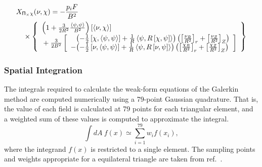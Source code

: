 \begin{eqnarray*}
  & \lefteqn{X_{\P_\times \chi}(\nu, \chi) = -\frac{p_i F}{B^2}} &
  \\ && \mbox{} \times 
  \left\{ \begin{array}{l}
    \left(1 + \frac{3}{2 R^2} \frac{\ip{\psi}{\psi}}{B^2} \right)
    \funcsa{\nu}{\chi}
    \\ \mbox{} + \frac{3}{2 B^2} \left[ \begin{array}{r@{}l}
      & \left(- \frac{1}{2} \pb{\chi}{\ip{\psi}{\psi}}
	      + \frac{1}{R} \ip{\psi}{R\pb{\chi}{\psi}} 
             \right)
	\left( \left[ \frac{\nu_R}{R^2} \right]_r
	     + \left[ \frac{\nu_Z}{R^2} \right]_Z \right)
    \\ \mbox{}
     - & \left(- \frac{1}{2} \pb{\nu}{\ip{\psi}{\psi}}
               + \frac{1}{R} \ip{\psi}{R\pb{\nu}{\psi}} 
              \right)
         \left( \left[ \frac{\chi_R}{R^2} \right]_r
	      + \left[ \frac{\chi_Z}{R^2} \right]_Z \right)
      \end{array} \right]
  \end{array} \right\}
\end{eqnarray*}

\subsubsection{Spatial Integration}

The integrals required to calculate the weak-form equations of the
Galerkin method are computed numerically using a 79-point Gaussian
quadrature.  That is, the value of each field is calculated at 79
points for each triangular element, and a weighted sum of these values
is computed to approximate the integral.
\[
  \int dA\ f(x) \simeq \sum_{i=1}^{79} w_i f(x_i),
\]
where the integrand $f(x)$ is restricted to a single element.  The
sampling points and weights appropriate for a equilateral triangle are
taken from ref.~\cite{Dunavant85}.

